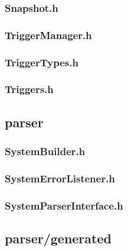\subsubsection*{Snapshot.h}


\subsubsection*{TriggerManager.h}


\subsubsection*{TriggerTypes.h}


\subsubsection*{Triggers.h}


\subsection*{parser}

\subsubsection*{SystemBuilder.h}


\subsubsection*{SystemErrorListener.h}


\subsubsection*{SystemParserInterface.h}


\subsection*{parser/generated}

